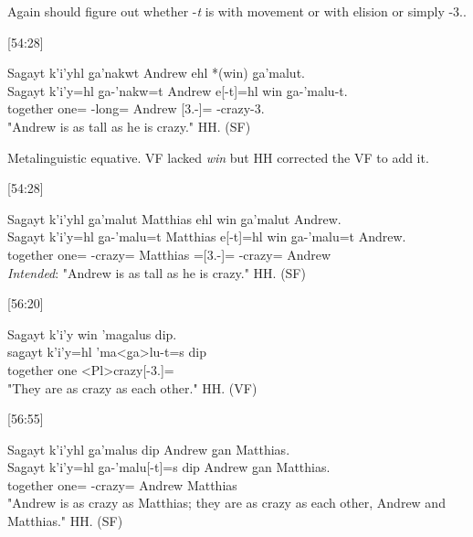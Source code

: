 Again should figure out whether -\textit{t} is \Sx{} with movement or \Pn{} with elision or simply -3.\Ii.

[54:28]
\begin{exe}
    \ex \glll
    Sag̱ayt k’i’yhl g̱a’nakwt Andrew ehl *(win) g̱a’malut. \\
    Sag̱ayt k’i’y=hl g̱a-’nakw=t Andrew e[-t]=hl win g̱a-’malu-t. \\
    together one=\Cn{} \Distr-long=\Pn{} Andrew \Prep{}[3.-\Ii]=\Cn{} \Comp{} \Distr-crazy-3.\Ii\\
    \glt "Andrew is as tall as he is crazy." \hfill HH.\ElicitationDate{} (SF)
\end{exe}

Metalinguistic equative. VF lacked \textit{win} but HH corrected the VF to add it.

[54:28]
\begin{exe}
    \ex \glll
    Sag̱ayt k’i’yhl g̱a’malut Matthias ehl win g̱a’malut Andrew. \\
    Sag̱ayt k’i’y=hl g̱a-’malu=t Matthias e[-t]=hl win g̱a-’malu=t Andrew. \\
    together one=\Cn{} \Distr-crazy=\Pn{} Matthias =\Prep{}[3.-\Ii]=\Cn{} \Comp{} \Distr-crazy=\Pn{} Andrew \\
    \glt \textit{Intended}: "Andrew is as tall as he is crazy." \hfill HH.\ElicitationDate{} (SF)
\end{exe}

[56:20]
\begin{exe}
    \ex \glll
    Sag̱ayt k’i’y win ’mag̱alus dip. \\
    sag̱ayt k’i’y=hl ’ma<g̱a>lu-t=s dip \\
    together one \Comp{} <Pl>crazy[-3.\Ii]=\Pn{} \Assoc \\
    \glt "They are as crazy as each other." \hfill HH.\ElicitationDate{} (VF)
\end{exe}

[56:55]
\begin{exe}
    \ex \glll
    Sag̱ayt k’i’yhl g̱a’malus dip Andrew g̱an Matthias. \\
    Sag̱ayt k’i’y=hl g̱a-’malu[-t]=s dip Andrew g̱an Matthias. \\
    together one=\Cn{} \Distr-crazy=\Pn{} \Assoc{} Andrew \Pcnj{} Matthias \\
    \glt "Andrew is as crazy as Matthias; they are as crazy as each other, Andrew and Matthias." \hfill HH.\ElicitationDate{} (SF)
\end{exe}

